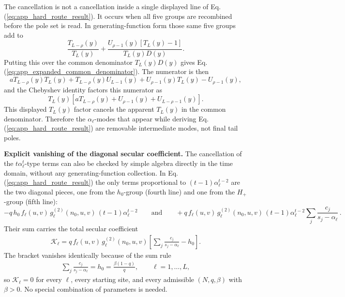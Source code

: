 \documentclass[superscriptaddress, amsmath, amssymb, aps, pre, floatfix]{revtex4-2}
\begin{document}
The cancellation is not a cancellation inside a single displayed line of Eq. (\ref{eq:app_hard_route_result}).  It occurs when all five groups are recombined before the pole set is read.  In generating-function form those same five groups add to
\[
\frac{T_{L-\rho}(y)}{T_L(y)}
+
\frac{U_{\rho-1}(y)\left[T_L(y)-1\right]}{T_L(y)D(y)}.
\]
Putting this over the common denominator \(T_L(y)D(y)\) gives Eq. (\ref{eq:app_expanded_common_denominator}).  The numerator is then
\[
  aT_{L-\rho}(y)T_L(y)+T_{L-\rho}(y)U_{L-1}(y)
  +U_{\rho-1}(y)T_L(y)-U_{\rho-1}(y),
\]
and the Chebyshev identity factors this numerator as
\[
  T_L(y)\left[aT_{L-\rho}(y)+U_{\rho-1}(y)+U_{L-\rho-1}(y)\right].
\]
This displayed \(T_L(y)\) factor cancels the apparent \(T_L(y)\) in the common denominator.  Therefore the \(\alpha_\ell\)-modes that appear while deriving Eq. (\ref{eq:app_hard_route_result}) are removable intermediate modes, not final tail poles.

\medskip
\noindent\textbf{Explicit vanishing of the diagonal secular coefficient.}
The cancellation of the \(t\alpha_\ell^t\)-type terms can also be checked by simple algebra directly in the time domain, without any generating-function collection.  In Eq. (\ref{eq:app_hard_route_result}) the only terms proportional to \((t-1)\alpha_\ell^{t-2}\) are the two diagonal pieces, one from the \(h_0\)-group (fourth line) and one from the \(H_+\)-group (fifth line):
\[
  -q\,h_0\,f_\ell(u,v)\,g^{(2)}_\ell(n_0,u,v)\,(t-1)\alpha_\ell^{t-2}
  \qquad\text{and}\qquad
  +q\,f_\ell(u,v)\,g^{(2)}_\ell(n_0,u,v)\,(t-1)\alpha_\ell^{t-2}\sum_j\frac{c_j}{s_j-\alpha_\ell}\,.
\]
Their sum carries the total secular coefficient
\begin{align}
  \mathcal K_\ell
  =q\,f_\ell(u,v)\,g^{(2)}_\ell(n_0,u,v)
  \left[\sum_j\frac{c_j}{s_j-\alpha_\ell}-h_0\right].
  \label{eq:app_secular_coeff}
\end{align}
The bracket vanishes identically because of the sum rule
\begin{align}
  \sum_j\frac{c_j}{s_j-\alpha_\ell}=h_0=\frac{\beta(1-q)}{q},
  \qquad \ell=1,\ldots,L,
  \label{eq:app_sum_rule}
\end{align}
so \(\mathcal K_\ell=0\) for every \(\ell\), every starting site, and every admissible \((N,q,\beta)\) with \(\beta>0\).  No special combination of parameters is needed.
\end{document}
